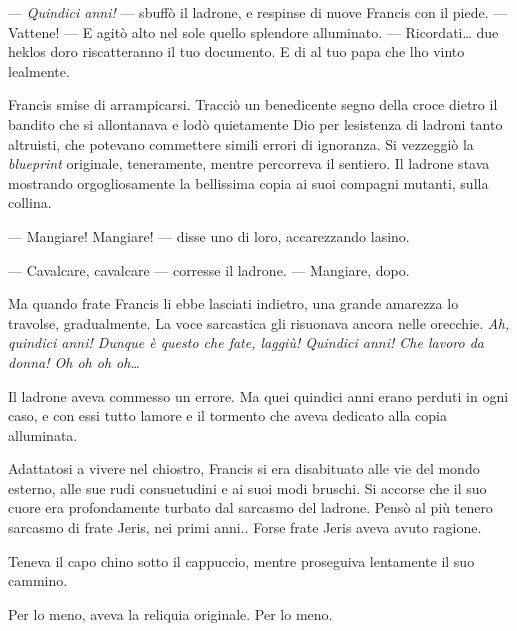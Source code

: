 --- \emph{Quindici anni!} --- sbuffò il ladrone, e respinse di nuove
Francis con il piede. --- Vattene! --- E agitò alto nel sole quello
splendore alluminato. --- Ricordati\ldots{} due heklos
d\textquotesingle oro riscatteranno il tuo documento. E
di\textquotesingle{} al tuo papa che l\textquotesingle ho vinto
lealmente.

Francis smise di arrampicarsi. Tracciò un benedicente segno della croce
dietro il bandito che si allontanava e lodò quietamente Dio per
l\textquotesingle esistenza di ladroni tanto altruisti, che potevano
commettere simili errori di ignoranza. Si vezzeggiò la \emph{blueprint}
originale, teneramente, mentre percorreva il sentiero. Il ladrone stava
mostrando orgogliosamente la bellissima copia ai suoi compagni mutanti,
sulla collina.

--- Mangiare! Mangiare! --- disse uno di loro, accarezzando
l\textquotesingle asino.

--- Cavalcare, cavalcare --- corresse il ladrone. --- Mangiare, dopo.

Ma quando frate Francis li ebbe lasciati indietro, una grande amarezza
lo travolse, gradualmente. La voce sarcastica gli risuonava ancora nelle
orecchie. \emph{Ah, quindici anni! Dunque è questo che fate, laggiù!
	Quindici anni! Che lavoro da donna! Oh oh oh oh\ldots{}}

Il ladrone aveva commesso un errore. Ma quei quindici anni erano perduti
in ogni caso, e con essi tutto l\textquotesingle amore e il tormento che
aveva dedicato alla copia alluminata.

Adattatosi a vivere nel chiostro, Francis si era disabituato alle vie
del mondo esterno, alle sue rudi consuetudini e ai suoi modi bruschi. Si
accorse che il suo cuore era profondamente turbato dal sarcasmo del
ladrone. Pensò al più tenero sarcasmo di frate Jeris, nei primi anni..
Forse frate Jeris aveva avuto ragione.

Teneva il capo chino sotto il cappuccio, mentre proseguiva lentamente il
suo cammino.

Per lo meno, aveva la reliquia originale. Per lo meno.
